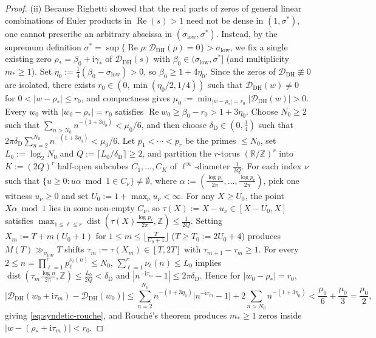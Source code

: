 \documentclass[11pt,a4paper,reqno]{amsart}
\theoremstyle{definition}
\theoremstyle{remark}
\numberwithin{equation}{section}
\newcommand{\R}{\mathbb{R}}
\newcommand{\Z}{\mathbb{Z}}
\newcommand{\ii}{\mathrm{i}}
\DeclareMathOperator{\Reop}{Re}
\begin{document}
\begin{proof}
(ii) Because Righetti \cite[Thm.~1.2]{righetti2017} showed that the real parts of zeros of general linear combinations of Euler products in $\Reop(s) > 1$ need not be dense in $(1, \sigma^*)$, one cannot prescribe an arbitrary abscissa in $(\sigma_{\mathrm{low}}, \sigma^*)$. Instead, by the supremum definition $\sigma^* = \sup\{\Reop\rho : \mathcal{D}_{\mathrm{DH}}(\rho) = 0\} > \sigma_{\mathrm{low}}$, we fix a single existing zero $\rho_* = \beta_0 + \ii\gamma_*$ of $\mathcal{D}_{\mathrm{DH}}(s)$ with $\beta_0 \in (\sigma_{\mathrm{low}}, \sigma^*]$ (and multiplicity $m_* \ge 1$). Set $\eta_0 := \frac{1}{4}(\beta_0 - \sigma_{\mathrm{low}}) > 0$, so $\beta_0 \ge 1 + 4\eta_0$. Since the zeros of $\mathcal{D}_{\mathrm{DH}} \not\equiv 0$ are isolated, there exists $r_0 \in (0, \min(\eta_0/2, 1/4))$ such that $\mathcal{D}_{\mathrm{DH}}(w) \ne 0$ for $0 < |w - \rho_*| \le r_0$, and compactness gives $\mu_0 := \min_{|w - \rho_*| = r_0}|\mathcal{D}_{\mathrm{DH}}(w)| > 0$. Every $w_0$ with $|w_0 - \rho_*| = r_0$ satisfies $\Reop w_0 \ge \beta_0 - r_0 > 1 + 3\eta_0$. Choose $N_0 \ge 2$ such that $\sum_{n > N_0} n^{-(1 + 3\eta_0)} < \mu_0/6$, and then choose $\delta_{\mathrm{D}} \in (0, \frac{1}{4})$ such that $2\pi\delta_{\mathrm{D}}\sum_{n=2}^{N_0} n^{-(1 + 3\eta_0)} < \mu_0/6$. Let $p_1 < \cdots < p_r$ be the primes $\le N_0$, set $L_0 := \log_2 N_0$ and $Q := \lceil L_0/\delta_{\mathrm{D}}\rceil \ge 2$, and partition the $r$-torus $(\R/\Z)^r$ into $K := (2Q)^r$ half-open subcubes $C_1, \ldots, C_K$ of $\ell^\infty$-diameter $\frac{1}{2Q}$. For each index $\nu$ such that $\{u \ge 0 : u\alpha \bmod 1 \in C_\nu\} \ne \emptyset$, where $\alpha := (\frac{\log p_1}{2\pi}, \ldots, \frac{\log p_r}{2\pi})$, pick one witness $u_\nu \ge 0$ and set $U_0 := 1 + \max_\nu u_\nu < \infty$. For any $X \ge U_0$, the point $X\alpha \bmod 1$ lies in some non-empty $C_\nu$, so $\tau(X) := X - u_\nu \in [X - U_0, X]$ satisfies $\max_{1 \le \ell \le r}\operatorname{dist}(\tau(X)\frac{\log p_\ell}{2\pi}, \Z) \le \frac{1}{2Q}$. Setting $X_m := T + m(U_0 + 1)$ for $1 \le m \le \lfloor \frac{T}{U_0 + 1}\rfloor$ ($T \ge T_0 := 2U_0 + 4$) produces $M(T) \gg_{\sigma_{\mathrm{low}}} T$ shifts $\tau_m := \tau(X_m) \in [T, 2T]$ with $\tau_{m+1} - \tau_m \ge 1$. For every $2 \le n = \prod_{\ell=1}^r p_\ell^{\nu_\ell(n)} \le N_0$, $\sum_{\ell=1}^r \nu_\ell(n) \le L_0$ implies $\operatorname{dist}(\tau_m\frac{\log n}{2\pi}, \Z) \le \frac{L_0}{2Q} < \delta_{\mathrm{D}}$ and $|n^{-\ii\tau_m} - 1| \le 2\pi\delta_{\mathrm{D}}$. Hence for $|w_0 - \rho_*| = r_0$,
\begin{equation*}
  \bigl|\mathcal{D}_{\mathrm{DH}}(w_0 + \ii\tau_m) - \mathcal{D}_{\mathrm{DH}}(w_0)\bigr|
  \le \sum_{n=2}^{N_0} n^{-(1 + 3\eta_0)}\bigl|n^{-\ii\tau_m} - 1\bigr| + 2\sum_{n > N_0} n^{-(1 + 3\eta_0)}
  < \frac{\mu_0}{6} + \frac{\mu_0}{3} = \frac{\mu_0}{2},
\end{equation*}
giving \eqref{eq:syndetic-rouche}, and Rouch\'e's theorem produces $m_* \ge 1$ zeros inside $|w - (\rho_* + \ii\tau_m)| < r_0$.


\end{proof}
\end{document}
